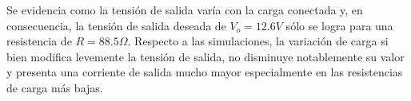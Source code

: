 Se evidencia como la tensión de salida varía con la carga conectada y, en consecuencia, la tensión de salida deseada de $V_{o}=12.6V$ sólo se logra para una resistencia de $R=88.5\Omega$.
Respecto a las simulaciones, la variación de carga si bien modifica levemente la tensión de salida, no disminuye notablemente su valor y presenta una corriente de salida mucho mayor especialmente en las resistencias de carga más bajas.